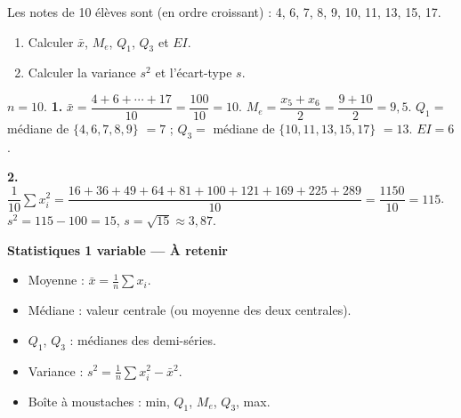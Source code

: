 \documentclass[11pt,a4paper,twoside]{book}
\begin{document}
\begin{center}
\end{center}

\begin{exercicebox}
Les notes de 10 élèves sont (en ordre croissant) : 4, 6, 7, 8, 9, 10, 11, 13, 15, 17.
\begin{enumerate}
  \item Calculer $\bar{x}$, $M_e$, $Q_1$, $Q_3$ et $EI$.
  \item Calculer la variance $s^2$ et l'écart-type $s$.
\end{enumerate}
\end{exercicebox}

\begin{correctionbox}[Correction]
$n=10$. \textbf{1.} $\bar{x}=\dfrac{4+6+\cdots+17}{10}=\dfrac{100}{10}=10$.
$M_e=\dfrac{x_5+x_6}{2}=\dfrac{9+10}{2}=9{,}5$.
$Q_1=$ médiane de $\{4,6,7,8,9\}$ $=7$ ; $Q_3=$ médiane de $\{10,11,13,15,17\}$ $=13$. $EI=6$.

\textbf{2.} $\dfrac{1}{10}\sum x_i^2 = \dfrac{16+36+49+64+81+100+121+169+225+289}{10}=\dfrac{1150}{10}=115$.
$s^2=115-100=15$, $s=\sqrt{15}\approx3{,}87$.
\end{correctionbox}

\begin{retenirbox}
\textbf{Statistiques 1 variable — À retenir}
\begin{itemize}
  \item Moyenne : $\bar{x}=\frac{1}{n}\sum x_i$.
  \item Médiane : valeur centrale (ou moyenne des deux centrales).
  \item $Q_1$, $Q_3$ : médianes des demi-séries.
  \item Variance : $s^2=\frac{1}{n}\sum x_i^2-\bar{x}^2$.
  \item Boîte à moustaches : min, $Q_1$, $M_e$, $Q_3$, max.
\end{itemize}
\end{retenirbox}
\end{document}
